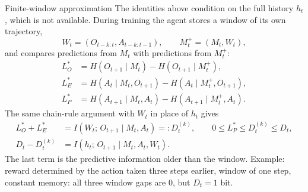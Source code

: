 \documentclass[11pt,aspectratio=169]{beamer}
\begin{document}
\begin{frame}[shrink=5]{Finite-window approximation}
The identities above condition on the full history $h_t$, which is not available. During training the agent stores a window of its own trajectory,
\[
W_t = (O_{t-k:t}, A_{t-k:t-1}), \qquad M^+_t = (M_t, W_t),
\]
and compares predictions from $M_t$ with predictions from $M^+_t$:
\begin{align*}
L^*_O &= H(O_{t+1} \mid M_t) - H(O_{t+1} \mid M^+_t), \\
L^*_E &= H(A_t \mid M_t, O_{t+1}) - H(A_t \mid M^+_t, O_{t+1}), \\
L^*_P &= H(A_{t+1} \mid M_t, A_t) - H(A_{t+1} \mid M^+_t, A_t).
\end{align*}
The same chain-rule argument with $W_t$ in place of $h_t$ gives
\begin{align*}
L^*_O + L^*_E &= I(W_t;\, O_{t+1} \mid M_t, A_t) =: D^{(k)}_t, \qquad 0 \le L^*_P \le D^{(k)}_t \le D_t, \\
D_t - D^{(k)}_t &= I(h_t;\, O_{t+1} \mid M_t, A_t, W_t).
\end{align*}
The last term is the predictive information older than the window. Example: reward determined by the action taken three steps earlier, window of one step, constant memory: all three window gaps are $0$, but $D_t = 1$ bit.
\end{frame}
\end{document}
